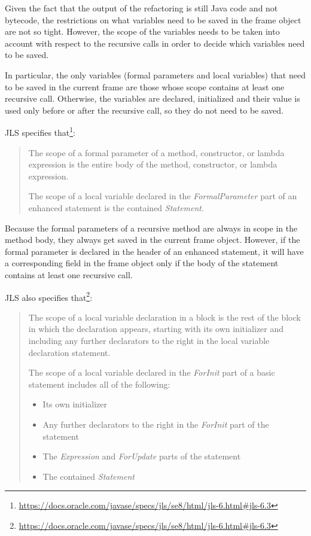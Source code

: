Given the fact that the output of the refactoring is still Java code and not bytecode, the restrictions on what
variables need to be saved in the frame object are not so tight. However, the scope of the variables needs to be taken
into account with respect to the recursive calls in order to decide which variables need to be saved.

In particular, the only variables (formal parameters and local variables) that need to be saved in the current frame are
those whose scope contains at least one recursive call. Otherwise, the variables are declared, initialized and their
value is used only before or after the recursive call, so they do not need to be saved.

JLS specifies that\footnote{\url{https://docs.oracle.com/javase/specs/jls/se8/html/jls-6.html#jls-6.3}}:
\begin{quote}
    The scope of a formal parameter of a method, constructor, or lambda expression is the entire body of the method,
    constructor, or lambda expression.

    The scope of a local variable declared in the \textit{FormalParameter} part of an enhanced  statement
    is the contained \textit{Statement}.
\end{quote}

Because the formal parameters of a recursive method are always in scope in the method body, they always get saved in the
current frame object. However, if the formal parameter is declared in the header of an enhanced  statement, it
will have a corresponding field in the frame object only if the body of the statement contains at least one recursive
call.

JLS also specifies that\footnote{\url{https://docs.oracle.com/javase/specs/jls/se8/html/jls-6.html#jls-6.3}}:
\begin{quote}
    The scope of a local variable declaration in a block is the rest of the block in which the declaration
    appears, starting with its own initializer and including any further declarators to the right in the local variable
    declaration statement.

    The scope of a local variable declared in the \textit{ForInit} part of a basic  statement includes all of
    the following:
    \begin{itemize}
        \item Its own initializer
        \item Any further declarators to the right in the \textit{ForInit} part of the  statement
        \item The \textit{Expression} and \textit{ForUpdate} parts of the  statement
        \item The contained \textit{Statement}
    \end{itemize}
\end{quote}

